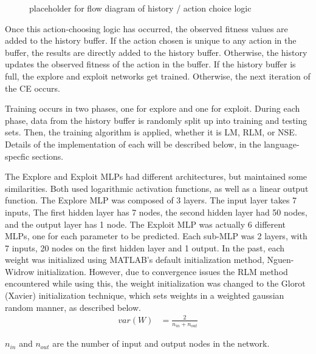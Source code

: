 \begin{figure}
\caption{placeholder for flow diagram of history / action choice logic}
\end{figure}
\par Once this action-choosing logic has occurred, the observed fitness values are added to the history buffer. If the action chosen is unique to any action in the buffer, the results are directly added to the history buffer. Otherwise, the history updates the observed fitness of the action in the buffer. If the history buffer is full, the explore and exploit networks get trained. Otherwise, the next iteration of the CE occurs.
\par Training occurs in two phases, one for explore and one for exploit. During each phase, data from the history buffer is randomly split up into training and testing sets. Then, the training algorithm is applied, whether it is LM, RLM, or NSE. Details of the implementation of each will be described below, in the language-specfic sections. 
\par The Explore and Exploit MLPs had different architectures, but maintained some similarities. Both used logarithmic activation functions, as well as a linear output function. The Explore MLP was composed of 3 layers. The input layer takes 7 inputs, The first hidden layer has 7 nodes, the second hidden layer had 50 nodes, and the output layer has 1 node. The Exploit MLP was actually 6 different MLPs, one for each parameter to be predicted. Each sub-MLP was 2 layers, with 7  inputs, 20 nodes on the first hidden layer and 1 output. In the past, each weight was initialized using MATLAB's default initialization method, Nguen-Widrow initialization. However, due to convergence issues the RLM method encountered while using this, the weight initialization was changed to the Glorot (Xavier) initialization technique\cite{placeholder_glorotInit}, which sets weights in a weighted gaussian random manner, as described below.
\begin{align*}
	var(W) &= \frac{2}{n_{in}+n_{out}}
\end{align*} 
\par $n_{in}$ and $n_{out}$ are the number of input and output nodes in the network.
